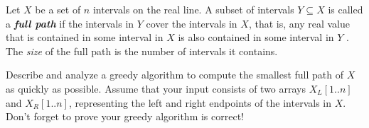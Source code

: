 \documentclass[a4paper, justified]{tufte-handout}
\begin{document}
\begin{ot}[Intervals]
	
	Let $X$ be a set of $n$ intervals on the real line. 
	A subset of intervals $Y\subseteq X$ is called a \textit{\textbf{full path}} if the intervals in $Y$ cover the intervals in $X$, that is, any real value that is contained in some interval in $X$ is also contained in some interval in $Y$ . The \textit{size} of the full path is the number of intervals it contains.
	
	
	Describe and analyze a greedy algorithm to compute the smallest full path of $X$ as quickly as possible. 
	Assume that your input consists of two arrays $X_L \left[1..n\right]$ and $X_R \left[1..n\right]$, representing the left and right endpoints of the intervals in $X$. Don't forget to prove your greedy algorithm is correct!
\end{ot}



% 




\beginfb

% 
% 
\end{document}
